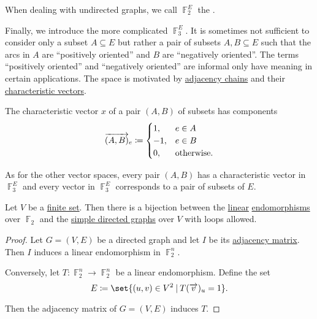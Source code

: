 \begin{definition}
\begin{thmenum}
    When dealing with undirected graphs, we call \( \BbbF_2^E \) the .

     Finally, we introduce the more complicated  \( \BbbF_3^E \). It is sometimes not sufficient to consider only a subset \( A \subseteq E \) but rather a pair of subsets \( A, B \subseteq E \) such that the arcs in \( A \) are \enquote{positively oriented} and \( B \) are \enquote{negatively oriented}. The terms \enquote{positively oriented} and \enquote{negatively oriented} are informal only have meaning in certain applications. The space is motivated by \hyperref[def:quiver_adjacency_chain]{adjacency chains} and their \hyperref[def:quiver_adjacency_chain/characteristic_vector]{characteristic vectors}.

    The characteristic vector \( x \) of a pair \( (A, B) \) of subsets has components
    \begin{equation*}
      \vect{(A, B)}_e \coloneqq \begin{cases}
        1,  &e \in A \\
        -1, &e \in B \\
        0,  &\T{otherwise.}
      \end{cases}
    \end{equation*}

    As for the other vector spaces, every pair \( (A, B) \) has a characteristic vector in \( \BbbF_3^E \) and every vector in \( \BbbF_3^E \) corresponds to a pair of subsets of \( E \).
  \end{thmenum}
\end{definition}

\begin{proposition}\label{thm:graphs_as_linear_transformations}
  Let \( V \) be a \hyperref[def:set_finiteness]{finite set}. Then there is a bijection between the \hyperref[def:linear_operator]{linear} \hyperref[def:endomorphism]{endomorphisms} over \( \BbbF_2 \) and the \hyperref[def:graph/simple_directed]{simple directed graphs} over \( V \) with loops allowed.
\end{proposition}
\begin{proof}
  Let \( G = (V, E) \) be a directed graph and let \( I \) be its \hyperref[def:graph_adjacency_matrix]{adjacency matrix}. Then \( I \) induces a linear endomorphism in \( \BbbF_2^n \).

  Conversely, let \( T: \BbbF_2^n \to \BbbF_2^n \) be a linear endomorphism. Define the set
  \begin{equation*}
    E \coloneqq \set{ (u, v) \in V^2 \given T(\vect{v})_u = 1 }.
  \end{equation*}

  Then the adjacency matrix of \( G = (V, E) \) induces \( T \).
\end{proof}

